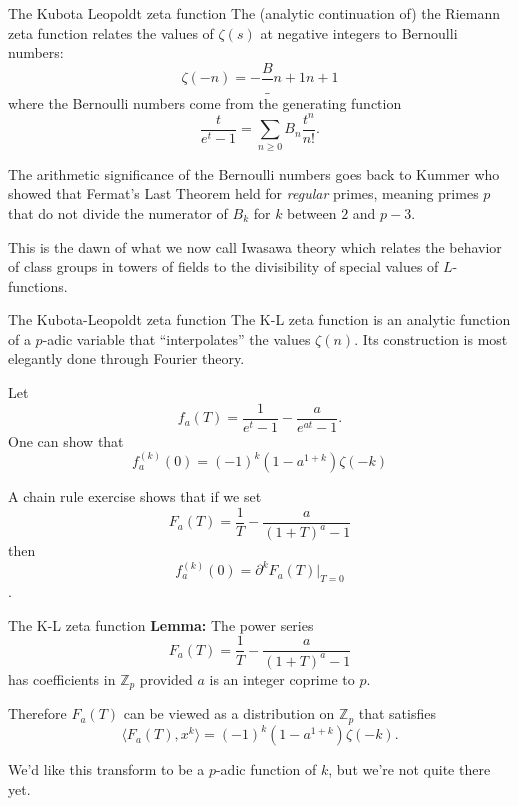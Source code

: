 \documentclass[
  ignorenonframetext,
]{beamer}
\begin{document}
\begin{frame}{The Kubota Leopoldt zeta function}
\protect\hypertarget{the-kubota-leopoldt-zeta-function}{}
The (analytic continuation of) the Riemann zeta function relates the
values of \(\zeta(s)\) at negative integers to Bernoulli numbers: \[
\zeta(-n)=-\frac{B}_{n+1}{n+1}
\] where the Bernoulli numbers come from the generating function \[
\frac{t}{e^{t}-1}=\sum_{n\ge 0} B_{n}\frac{t^{n}}{n!}.
\]

The arithmetic significance of the Bernoulli numbers goes back to Kummer
who showed that Fermat's Last Theorem held for \emph{regular} primes,
meaning primes \(p\) that do not divide the numerator of \(B_k\) for
\(k\) between \(2\) and \(p-3\).

This is the dawn of what we now call Iwasawa theory which relates the
behavior of class groups in towers of fields to the divisibility of
special values of \(L\)-functions.
\end{frame}

\begin{frame}{The Kubota-Leopoldt zeta function}
\protect\hypertarget{the-kubota-leopoldt-zeta-function-1}{}
The K-L zeta function is an analytic function of a \(p\)-adic variable
that ``interpolates'' the values \(\zeta(n)\). Its construction is most
elegantly done through Fourier theory.

Let \[
f_a(T)=\frac{1}{e^{t}-1}-\frac{a}{e^{at}-1}.
\] One can show that \[
f_a^(k)(0) = (-1)^k(1-a^{1+k})\zeta(-k)
\]

A chain rule exercise shows that if we set \[
F_a(T)=\frac{1}{T}-\frac{a}{(1+T)^a-1}
\] then \[f_{a}^{(k)}(0)=\partial^{k}F_{a}(T)|_{T=0}\].
\end{frame}

\begin{frame}{The K-L zeta function}
\protect\hypertarget{the-k-l-zeta-function}{}
\textbf{Lemma:} The power series \[
F_{a}(T)=\frac{1}{T}-\frac{a}{(1+T)^{a}-1}
\] has coefficients in \(\mathbb{Z}_p\) provided \(a\) is an integer
coprime to \(p\).

Therefore \(F_a(T)\) can be viewed as a distribution on \(\mathbb{Z}_p\)
that satisfies \[
\langle F_a(T),x^k\rangle = (-1)^k(1-a^{1+k})\zeta(-k).
\]

We'd like this transform to be a \(p\)-adic function of \(k\), but we're
not quite there yet.
\end{frame}
\end{document}
